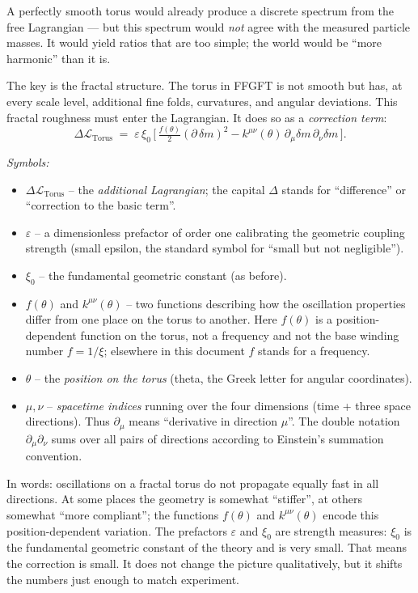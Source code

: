 A perfectly smooth torus would already produce a discrete spectrum
from the free Lagrangian --- but this spectrum would \emph{not} agree
with the measured particle masses. It would yield ratios that are
too simple; the world would be \enquote{more harmonic} than it is.

The key is the fractal structure. The torus in FFGFT is not smooth
but has, at every scale level, additional fine folds, curvatures,
and angular deviations. This fractal roughness must enter the
Lagrangian. It does so as a \emph{correction term}:
\[
  \Delta\mathcal{L}_{\text{Torus}}
  \;=\; \varepsilon\,\xi_0\,
        \bigl[\, \tfrac{f(\theta)}{2}(\partial\,\delta m)^2
              - k^{\mu\nu}(\theta)\,\partial_\mu\delta m\,\partial_\nu\delta m \,\bigr].
\]

\noindent\textit{Symbols:}
\begin{itemize}\setlength\itemsep{0pt}
  \item $\Delta\mathcal{L}_{\text{Torus}}$ -- the \emph{additional
        Lagrangian}; the capital $\Delta$ stands for
        \enquote{difference} or \enquote{correction to the basic term}.
  \item $\varepsilon$ -- a dimensionless prefactor of order one
        calibrating the geometric coupling strength (small epsilon,
        the standard symbol for \enquote{small but not negligible}).
  \item $\xi_0$ -- the fundamental geometric constant (as before).
  \item $f(\theta)$ and $k^{\mu\nu}(\theta)$ -- two functions
        describing how the oscillation properties differ from one
        place on the torus to another. Here $f(\theta)$ is a
        position-dependent function on the torus, not a frequency and
        not the base winding number $f = 1/\xi$; elsewhere in this
        document $f$ stands for a frequency.
  \item $\theta$ -- the \emph{position on the torus} (theta, the Greek
        letter for angular coordinates).
  \item $\mu, \nu$ -- \emph{spacetime indices} running over the four
        dimensions (time + three space directions). Thus $\partial_\mu$
        means \enquote{derivative in direction $\mu$}. The double
        notation $\partial_\mu\partial_\nu$ sums over all pairs of
        directions according to Einstein's summation convention.
\end{itemize}

\medskip\noindent
In words: oscillations on a fractal torus do not propagate equally
fast in all directions. At some places the geometry is somewhat
\enquote{stiffer}, at others somewhat \enquote{more compliant}; the
functions $f(\theta)$ and $k^{\mu\nu}(\theta)$ encode this
position-dependent variation. The prefactors $\varepsilon$ and
$\xi_0$ are strength measures: $\xi_0$ is the fundamental geometric
constant of the theory and is very small. That means the correction
is small. It does not change the picture qualitatively, but it
shifts the numbers just enough to match experiment.

